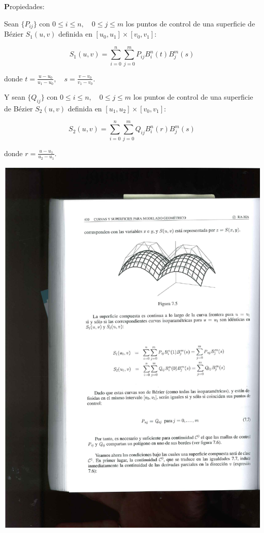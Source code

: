 \documentclass[ebook,oneside]{memoir}
\begin{document}
{\textbf Propiedades:}

Sean $\{P_{ij}\}$ con $0\leq i\leq n,\quad 0\leq j\leq m$ los puntos de control de una superficie de B\'{e}zier $S_1(u,v)$ definida en $[u_0,u_1] \times [v_0,v_1]$:

$$S_1(u,v)=\sum_{i=0}^n \sum_{j=0}^m P_{ij} B_i^n(t) B_j^m(s)$$

donde $t=\frac{u-u_0}{u_1-u_0},\quad s=\frac{v-v_0}{v_1-v_0}$.

\vspace{0.2cm}

Y sean $\{Q_{ij}\}$ con $0\leq i\leq n,\quad 0\leq j\leq m$ los puntos de control de una superficie de B\'{e}zier $S_2(u,v)$ definida en $[u_1,u_2] \times [v_0,v_1]$:

$$S_2(u,v)= \sum_{i=0}^n \sum_{j=0}^m Q_{ij} B_i^n(r) B_j^m(s)$$

donde $r=\frac{u-u_1}{u_2-u_1}.$

\begin{center}
\includegraphics[scale=0.45]{7_5.pdf}
\end{center}
\end{document}
